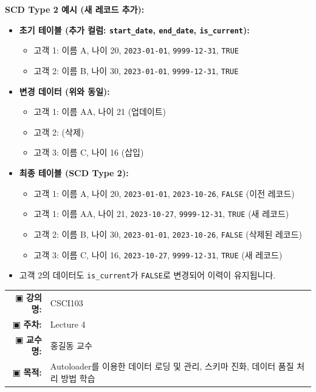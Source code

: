 \documentclass[11pt,a4paper]{article}
\makeatletter
\theoremstyle{definition}
\newcommand{\metainfo}[4]{
\begin{tcolorbox}[
    colback=lightpurple,
    colframe=darkpurple,
    boxrule=1pt,
    arc=2mm,
    left=10pt,
    right=10pt,
    top=8pt,
    bottom=8pt
]
\begin{tabular}{@{}rl@{}}
▣ \textbf{강의명:} & #1 \\[0.3em]
▣ \textbf{주차:} & #2 \\[0.3em]
▣ \textbf{교수명:} & #3 \\[0.3em]
▣ \textbf{목적:} & \begin{minipage}[t]{0.75\textwidth}#4\end{minipage}
\end{tabular}
\end{tcolorbox}
}
\makeatother
\begin{document}
\begin{examplebox}
\textbf{SCD Type 2 예시 (새 레코드 추가):}
\begin{itemize}
    \item \textbf{초기 테이블 (추가 컬럼: \texttt{start_date}, \texttt{end_date}, \texttt{is_current}):}
        \begin{itemize}
            \item 고객 1: 이름 A, 나이 20, \texttt{2023-01-01}, \texttt{9999-12-31}, \texttt{TRUE}
            \item 고객 2: 이름 B, 나이 30, \texttt{2023-01-01}, \texttt{9999-12-31}, \texttt{TRUE}
        \end{itemize}
    \item \textbf{변경 데이터 (위와 동일):}
        \begin{itemize}
            \item 고객 1: 이름 AA, 나이 21 (업데이트)
            \item 고객 2: (삭제)
            \item 고객 3: 이름 C, 나이 16 (삽입)
        \end{itemize}
    \item \textbf{최종 테이블 (SCD Type 2):}
        \begin{itemize}
            \item 고객 1: 이름 A, 나이 20, \texttt{2023-01-01}, \texttt{2023-10-26}, \texttt{FALSE} (이전 레코드)
            \item 고객 1: 이름 AA, 나이 21, \texttt{2023-10-27}, \texttt{9999-12-31}, \texttt{TRUE} (새 레코드)
            \item 고객 2: 이름 B, 나이 30, \texttt{2023-01-01}, \texttt{2023-10-26}, \texttt{FALSE} (삭제된 레코드)
            \item 고객 3: 이름 C, 나이 16, \texttt{2023-10-27}, \texttt{9999-12-31}, \texttt{TRUE} (새 레코드)
        \end{itemize}
    \item 고객 2의 데이터도 \texttt{is_current}가 \texttt{FALSE}로 변경되어 이력이 유지됩니다.
\end{itemize}
\end{examplebox}

\newpage

\thispagestyle{firstpage}

\metainfo{CSCI103}{Lecture 4}{홍길동 교수}{Autoloader를 이용한 데이터 로딩 및 관리, 스키마 진화, 데이터 품질 처리 방법 학습}

\tableofcontents

\newpage
\end{document}
